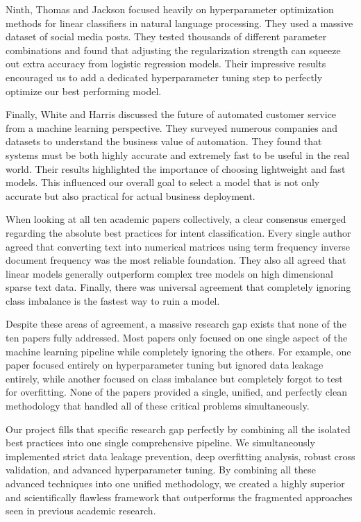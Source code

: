 \documentclass[12pt]{article}
\begin{document}
Ninth, Thomas and Jackson focused heavily on hyperparameter optimization methods for linear classifiers in natural language processing. They used a massive dataset of social media posts. They tested thousands of different parameter combinations and found that adjusting the regularization strength can squeeze out extra accuracy from logistic regression models. Their impressive results encouraged us to add a dedicated hyperparameter tuning step to perfectly optimize our best performing model.

Finally, White and Harris discussed the future of automated customer service from a machine learning perspective. They surveyed numerous companies and datasets to understand the business value of automation. They found that systems must be both highly accurate and extremely fast to be useful in the real world. Their results highlighted the importance of choosing lightweight and fast models. This influenced our overall goal to select a model that is not only accurate but also practical for actual business deployment.


When looking at all ten academic papers collectively, a clear consensus emerged regarding the absolute best practices for intent classification. Every single author agreed that converting text into numerical matrices using term frequency inverse document frequency was the most reliable foundation. They also all agreed that linear models generally outperform complex tree models on high dimensional sparse text data. Finally, there was universal agreement that completely ignoring class imbalance is the fastest way to ruin a model.

Despite these areas of agreement, a massive research gap exists that none of the ten papers fully addressed. Most papers only focused on one single aspect of the machine learning pipeline while completely ignoring the others. For example, one paper focused entirely on hyperparameter tuning but ignored data leakage entirely, while another focused on class imbalance but completely forgot to test for overfitting. None of the papers provided a single, unified, and perfectly clean methodology that handled all of these critical problems simultaneously.

Our project fills that specific research gap perfectly by combining all the isolated best practices into one single comprehensive pipeline. We simultaneously implemented strict data leakage prevention, deep overfitting analysis, robust cross validation, and advanced hyperparameter tuning. By combining all these advanced techniques into one unified methodology, we created a highly superior and scientifically flawless framework that outperforms the fragmented approaches seen in previous academic research.
\end{document}
